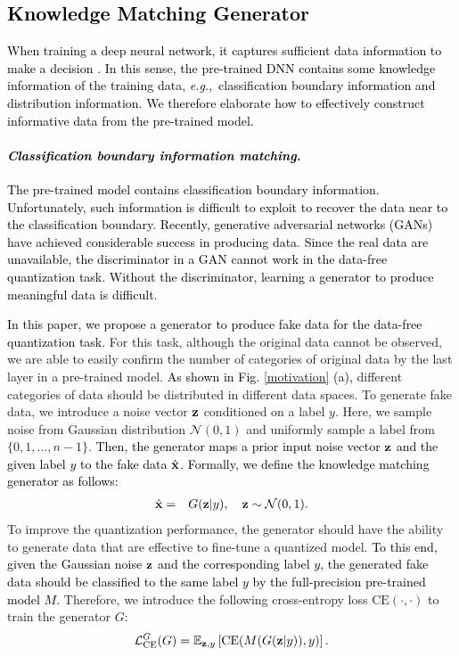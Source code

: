 \documentclass[runningheads]{llncs}
\def\eg{\emph{e.g}\onedot}
\def\eg{\mbox{\textit{e.g.}, }}
\def\CE{\text{CE}}
\def\onehot{\mathrm{CE}}
\def\mL{{\mathcal L}}
\def\mN{{\mathcal N}}
\def\bx{{\bf x}}
\def\bz{{\bf z}}
\def\mmE{{\mathbb E}}
\def\bx{{\bf x}}
\def\bz{{\bf z}}
\def\jie{\textcolor{black}}
\def\new{\textcolor{black}}
\begin{document}
\subsection{\jie{Knowledge Matching Generator}}
\label{generator}
\jie{
When training a deep neural network, it captures sufficient data information to make a decision \cite{zhang2016understanding}. 
In this sense, the pre-trained DNN contains some knowledge information of the training data, \eg classification boundary information and distribution information.
We therefore elaborate how to effectively construct informative data from the pre-trained model.
}


\paragraph{\emph{\textbf{\jie{Classification boundary information matching.}}}}
\jie{
The pre-trained model contains classification boundary information.
Unfortunately, such information is \new{difficult} to \new{exploit} to recover the data \new{near to} the classification boundary. 
Recently, generative adversarial networks (GANs) \cite{goodfellow2014generative,cao2018adversarial,cao2019multi} have achieved considerable success \new{in producing} data.
\new{Since the real data are unavailable, the discriminator in a GAN cannot work in the data-free quantization task.}
Without the discriminator, \new{learning a generator to produce meaningful data is difficult.}
}

\jie{In this paper, we propose a generator to produce fake data for \new{the} data-free quantization task.}
For this task, although the original data cannot be observed, we are able to easily confirm the number of categories of original data by the last layer in a pre-trained model.
\jie{As shown in Fig. \ref{motivation} (a),} different categories of data should be distributed in different data spaces.
To generate fake data, we introduce a noise vector $\bz$ conditioned on a label $y$.
Here, we sample noise from Gaussian distribution $\mN({0},{1})$ and uniformly sample a label from $\{0, 1, ..., n-1\}$.
\jie{Then, the generator maps a prior input noise vector $\bz$ and the given label $y$ to \new{the} fake data $\hat{\bx}$.
Formally, we define the knowledge matching generator as follows:}
\begin{eqnarray}\label{eq:generate_fake_image}
\hat{\bx}&=&G(\bz|y),\quad \bz \sim \mN({0},{1}).
\end{eqnarray}
To improve the quantization performance, the generator should have the ability to generate data that are effective to fine-tune a quantized model.
\jie{To this \new{end}, given the Gaussian noise $\bz$ and the corresponding label $y$, the generated fake data should be classified to the same label $y$ by the full-precision pre-trained model $M$.}
Therefore, we introduce the following cross-entropy loss $\CE(\cdot,\cdot)$ to train the generator $G$:
\begin{eqnarray}\label{eq:generate_onehot_loss}
\mL^G_\onehot(G)=\mmE_{\bz, y}\left[\CE(M(G(\bz|y)), y)\right].
\end{eqnarray}
\end{document}
